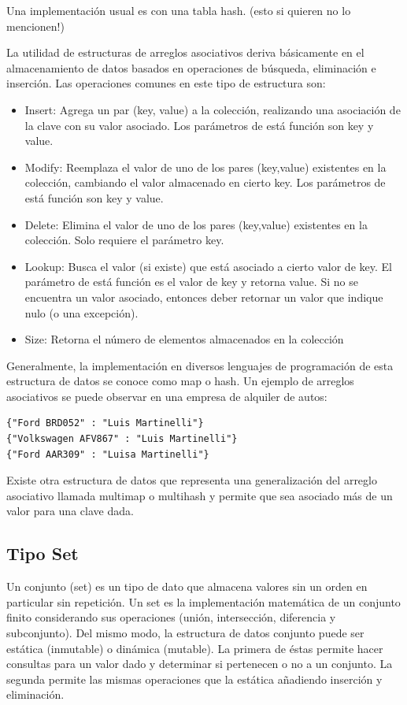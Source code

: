 Una implementación usual es con una tabla hash. (esto si quieren no lo mencionen!)

La utilidad de estructuras de arreglos asociativos deriva básicamente en el almacenamiento de datos basados en operaciones de búsqueda, eliminación e inserción. Las operaciones comunes en este tipo de estructura son:
\begin{itemize}
\item Insert: Agrega un par (key, value) a la colección, realizando una asociación de la clave con su valor asociado. Los parámetros de está función son key y value.
\item Modify: Reemplaza el valor de uno de los pares (key,value) existentes en la colección, cambiando el valor almacenado en cierto key. Los parámetros de está función son key y value.
\item Delete: Elimina el valor de uno de los pares (key,value) existentes en la colección. Solo requiere el parámetro key.
\item Lookup: Busca el valor (si existe) que está asociado a cierto valor de key. El parámetro de está función es el valor de key y retorna value. Si no se encuentra un valor asociado, entonces deber retornar un valor que indique nulo (o una excepción).
\item Size: Retorna el número de elementos almacenados en la colección
\end{itemize}
Generalmente, la implementación en diversos lenguajes de programación de esta estructura de datos se conoce como map o hash. Un ejemplo de arreglos asociativos se puede observar en una empresa de alquiler de autos:
\begin{lstlisting}[upquote=true, language=html]
{"Ford BRD052" : "Luis Martinelli"}
{"Volkswagen AFV867" : "Luis Martinelli"}
{"Ford AAR309" : "Luisa Martinelli"}
\end{lstlisting}

Existe otra estructura de datos que representa una generalización del arreglo asociativo llamada multimap o multihash y permite que sea asociado más de un valor para una clave dada. 

\subsection{Tipo Set}

Un conjunto (set) es un tipo de dato que almacena valores sin un orden en particular sin repetición. Un set es la implementación matemática de un conjunto finito considerando sus operaciones (unión, intersección, diferencia y subconjunto). Del mismo modo, la estructura de datos conjunto puede ser estática (inmutable) o dinámica (mutable). La primera de éstas permite hacer consultas para un valor dado y determinar si pertenecen o no a un conjunto. La segunda permite las mismas operaciones que la estática añadiendo inserción y eliminación.

